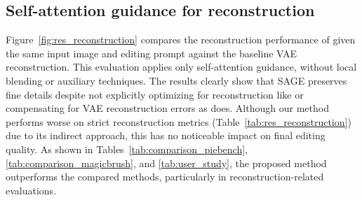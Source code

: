 \subsection{Self-attention guidance for reconstruction}
\label{sec:sup_reconstruction}
Figure~\ref{fig:res_reconstruction} compares the reconstruction performance of \method{} given the same input image and editing prompt against the baseline VAE reconstruction. This evaluation applies only self-attention guidance, without local blending or auxiliary techniques. The results clearly show that SAGE preserves fine details despite not explicitly optimizing for reconstruction like \nulltextlong{} or compensating for VAE reconstruction errors as \directinversionlong{} does. Although our method performs worse on strict reconstruction metrics (Table~\ref{tab:res_reconstruction}) due to its indirect approach, this has no noticeable impact on final editing quality. As shown in Tables~\ref{tab:comparison_piebench}, \ref{tab:comparison_magicbrush}, and \ref{tab:user_study}, the proposed method outperforms the compared methods, particularly in reconstruction-related evaluations.






% 

